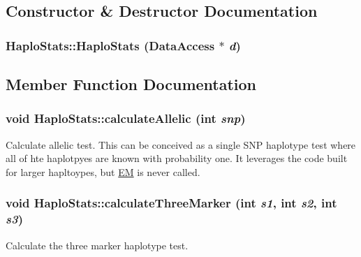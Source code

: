 \subsection{Constructor \& Destructor Documentation}
\hypertarget{classHaploStats_ada2d93862b794d80fe0903410689234e}{
\subsubsection[{HaploStats}]{\setlength{\rightskip}{0pt plus 5cm}HaploStats::HaploStats ({\bf DataAccess} $\ast$ {\em d})}}
\label{classHaploStats_ada2d93862b794d80fe0903410689234e}


\subsection{Member Function Documentation}
\hypertarget{classHaploStats_ae7c212db625f88424070abcc364ed89f}{
\subsubsection[{calculateAllelic}]{\setlength{\rightskip}{0pt plus 5cm}void HaploStats::calculateAllelic (int {\em snp})}}
\label{classHaploStats_ae7c212db625f88424070abcc364ed89f}
Calculate allelic test. This can be conceived as a single SNP haplotype test where all of hte haplotpyes are known with probability one. It leverages the code built for larger hapltoypes, but \hyperlink{classEM}{EM} is never called. \hypertarget{classHaploStats_af2525446b1f48c377adeffd328c53cba}{
\subsubsection[{calculateThreeMarker}]{\setlength{\rightskip}{0pt plus 5cm}void HaploStats::calculateThreeMarker (int {\em s1}, \/  int {\em s2}, \/  int {\em s3})}}
\label{classHaploStats_af2525446b1f48c377adeffd328c53cba}
Calculate the three marker haplotype test.

